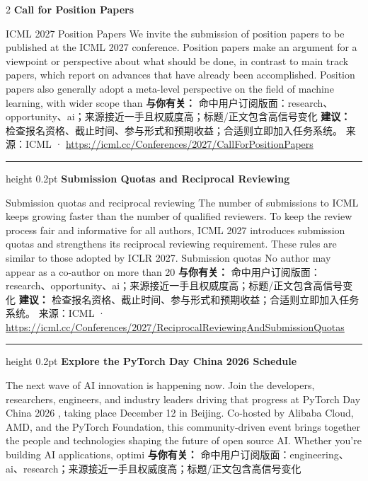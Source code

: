 \documentclass[10.5pt]{ctexart}
\begin{document}
\begin{multicols}{2}
{\large\bfseries Call for Position Papers}\par
ICML 2027 Position Papers We invite the submission of position papers to be published at the ICML 2027 conference. Position papers make an argument for a viewpoint or perspective about what should be done, in contrast to main track papers, which report on advances that have already been accomplished. Position papers also generally adopt a meta-level perspective on the field of machine learning, with wider scope than 
\textbf{与你有关：} 命中用户订阅版面：research、opportunity、ai；来源接近一手且权威度高；标题/正文包含高信号变化
\textbf{建议：} 检查报名资格、截止时间、参与形式和预期收益；合适则立即加入任务系统。
{\footnotesize\color{ormuted} 来源：ICML · \url{https://icml.cc/Conferences/2027/CallForPositionPapers}}
\vspace{2mm}
\hrule height 0.2pt
\vspace{2mm}
{\large\bfseries Submission Quotas and Reciprocal Reviewing}\par
Submission quotas and reciprocal reviewing The number of submissions to ICML keeps growing faster than the number of qualified reviewers. To keep the review process fair and informative for all authors, ICML 2027 introduces submission quotas and strengthens its reciprocal reviewing requirement. These rules are similar to those adopted by ICLR 2027. Submission quotas No author may appear as a co-author on more than 20
\textbf{与你有关：} 命中用户订阅版面：research、opportunity、ai；来源接近一手且权威度高；标题/正文包含高信号变化
\textbf{建议：} 检查报名资格、截止时间、参与形式和预期收益；合适则立即加入任务系统。
{\footnotesize\color{ormuted} 来源：ICML · \url{https://icml.cc/Conferences/2027/ReciprocalReviewingAndSubmissionQuotas}}
\vspace{2mm}
\hrule height 0.2pt
\vspace{2mm}
{\large\bfseries Explore the PyTorch Day China 2026 Schedule}\par
The next wave of AI innovation is happening now. Join the developers, researchers, engineers, and industry leaders driving that progress at PyTorch Day China 2026 , taking place December 12 in Beijing. Co-hosted by Alibaba Cloud, AMD, and the PyTorch Foundation, this community-driven event brings together the people and technologies shaping the future of open source AI. Whether you’re building AI applications, optimi
\textbf{与你有关：} 命中用户订阅版面：engineering、ai、research；来源接近一手且权威度高；标题/正文包含高信号变化

\end{multicols}
\end{document}
